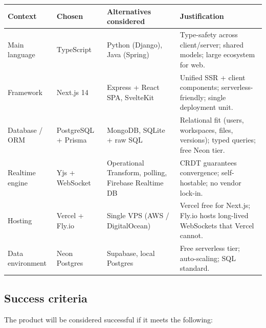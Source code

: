 \documentclass[11pt,a4paper]{article}
\begin{document}
\begin{center}
\begin{tabular}{|p{3.4cm}|p{3.0cm}|p{4.0cm}|p{5.4cm}|}
\hline
\textbf{Context} & \textbf{Chosen} & \textbf{Alternatives considered} & \textbf{Justification} \\
\hline
Main language & TypeScript & Python (Django), Java (Spring) & Type-safety across client/server; shared models; large ecosystem for web. \\
\hline
Framework & Next.js 14 & Express + React SPA, SvelteKit & Unified SSR + client components; serverless-friendly; single deployment unit. \\
\hline
Database / ORM & PostgreSQL + Prisma & MongoDB, SQLite + raw SQL & Relational fit (users, workspaces, files, versions); typed queries; free Neon tier. \\
\hline
Realtime engine & Yjs + WebSocket & Operational Transform, polling, Firebase Realtime DB & CRDT guarantees convergence; self-hostable; no vendor lock-in. \\
\hline
Hosting & Vercel + Fly.io & Single VPS (AWS / DigitalOcean) & Vercel free for Next.js; Fly.io hosts long-lived WebSockets that Vercel cannot. \\
\hline
Data environment & Neon Postgres & Supabase, local Postgres & Free serverless tier; auto-scaling; SQL standard. \\
\hline
\end{tabular}
\end{center}

\subsection*{Success criteria}

The product will be considered successful if it meets the following:
\end{document}
